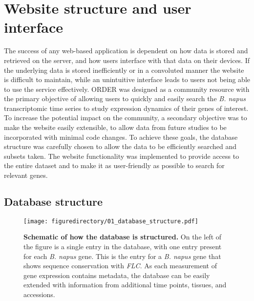 \documentclass[12pt,]{book}
\begin{document}
\section{Website structure and user
interface}\label{website-structure-and-user-interface}

The success of any web-based application is dependent on how data is
stored and retrieved on the server, and how users interface with that
data on their devices. If the underlying data is stored inefficiently or
in a convoluted manner the website is difficult to maintain, while an
unintuitive interface leads to users not being able to use the service
effectively. ORDER was designed as a community resource with the primary
objective of allowing users to quickly and easily search the \emph{B.
napus} transcriptomic time series to study expression dynamics of their
genes of interest. To increase the potential impact on the community, a
secondary objective was to make the website easily extensible, to allow
data from future studies to be incorporated with minimal code changes.
To achieve these goals, the database structure was carefully chosen to
allow the data to be efficiently searched and subsets taken. The website
functionality was implemented to provide access to the entire dataset
and to make it as user-friendly as possible to search for relevant
genes.

\subsection{Database structure}\label{database-structure}

\begin{figure}[htbp]
\centering
\texttt{[image: figuredirectory/01\_database\_structure.pdf]}
\caption{\textbf{Schematic of how the database is structured.} On the
left of the figure is a single entry in the database, with one entry
present for each \emph{B. napus} gene. This is the entry for a \emph{B.
napus} gene that shows sequence conservation with \emph{FLC}. As each
measurement of gene expression contains metadata, the database can be
easily extended with information from additional time points, tissues,
and accessions.}\label{figure:website:database}
\end{figure}
\end{document}
